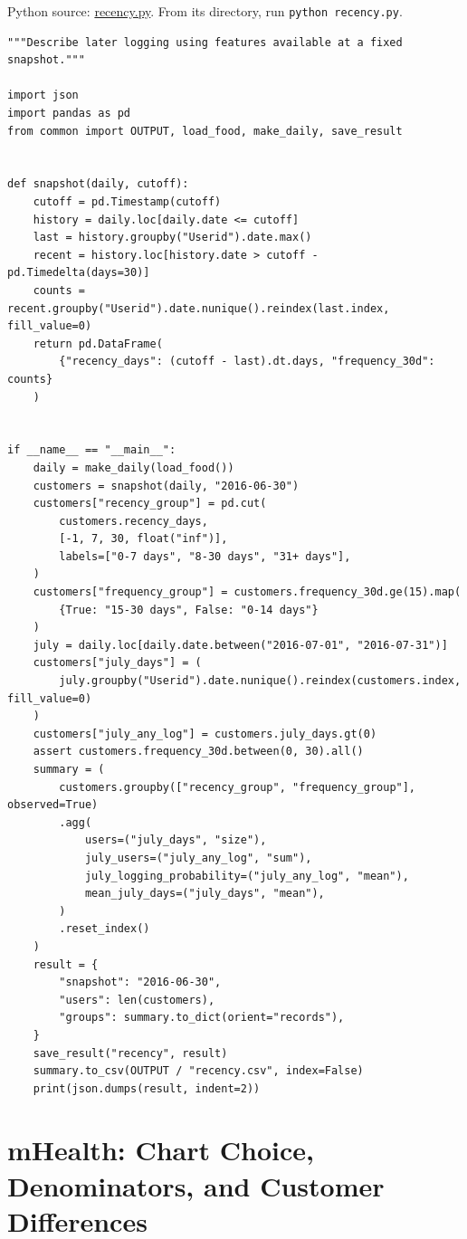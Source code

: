 \FloatBarrier
{}
Python source:
\href{../03_Data_and_Code/mHealth/recurring_examples/recency.py}{recency.py}.
From its directory, run \texttt{python\ recency.py}.

\begin{Verbatim}[breaklines,breakanywhere,fontsize=\small]
"""Describe later logging using features available at a fixed snapshot."""

import json
import pandas as pd
from common import OUTPUT, load_food, make_daily, save_result


def snapshot(daily, cutoff):
    cutoff = pd.Timestamp(cutoff)
    history = daily.loc[daily.date <= cutoff]
    last = history.groupby("Userid").date.max()
    recent = history.loc[history.date > cutoff - pd.Timedelta(days=30)]
    counts = recent.groupby("Userid").date.nunique().reindex(last.index, fill_value=0)
    return pd.DataFrame(
        {"recency_days": (cutoff - last).dt.days, "frequency_30d": counts}
    )


if __name__ == "__main__":
    daily = make_daily(load_food())
    customers = snapshot(daily, "2016-06-30")
    customers["recency_group"] = pd.cut(
        customers.recency_days,
        [-1, 7, 30, float("inf")],
        labels=["0-7 days", "8-30 days", "31+ days"],
    )
    customers["frequency_group"] = customers.frequency_30d.ge(15).map(
        {True: "15-30 days", False: "0-14 days"}
    )
    july = daily.loc[daily.date.between("2016-07-01", "2016-07-31")]
    customers["july_days"] = (
        july.groupby("Userid").date.nunique().reindex(customers.index, fill_value=0)
    )
    customers["july_any_log"] = customers.july_days.gt(0)
    assert customers.frequency_30d.between(0, 30).all()
    summary = (
        customers.groupby(["recency_group", "frequency_group"], observed=True)
        .agg(
            users=("july_days", "size"),
            july_users=("july_any_log", "sum"),
            july_logging_probability=("july_any_log", "mean"),
            mean_july_days=("july_days", "mean"),
        )
        .reset_index()
    )
    result = {
        "snapshot": "2016-06-30",
        "users": len(customers),
        "groups": summary.to_dict(orient="records"),
    }
    save_result("recency", result)
    summary.to_csv(OUTPUT / "recency.csv", index=False)
    print(json.dumps(result, indent=2))
\end{Verbatim}

\hypertarget{M02-mhealth-chart-choice-denominators-and-customer-differences}{%
\section{mHealth: Chart Choice, Denominators, and Customer
Differences}\label{M02-mhealth-chart-choice-denominators-and-customer-differences}}

